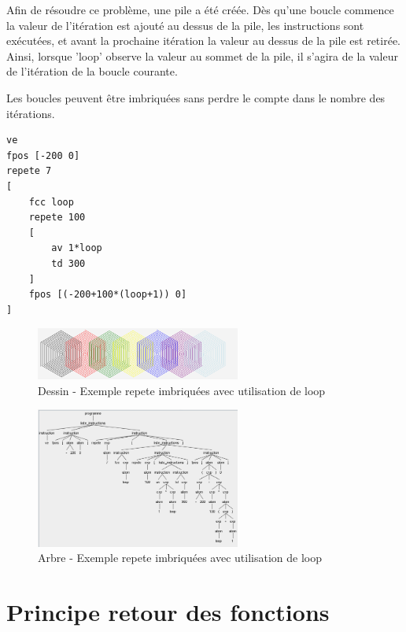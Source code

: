 \documentclass[a4paper,11pt]{article}
\begin{document}
Afin de résoudre ce problème, une pile a été créée. Dès qu'une boucle commence la valeur de l'itération est ajouté au dessus de la pile, les instructions sont exécutées, et avant la prochaine itération la valeur au dessus de la pile est retirée. Ainsi, lorsque 'loop' observe la valeur au sommet de la pile, il s'agira de la valeur de l'itération de la boucle courante.

Les boucles peuvent être imbriquées sans perdre le compte dans le nombre des itérations. 
\begin{lstlisting}[language=LOGO]
ve
fpos [-200 0]
repete 7
[
	fcc loop
	repete 100
	[
		av 1*loop
		td 300
	]
	fpos [(-200+100*(loop+1)) 0]	
]
\end{lstlisting}
\begin{figure}[!h]
	\centering
	\includegraphics[width=0.6\textwidth]{img/loop_figure}
	\caption{Dessin - Exemple repete imbriquées avec utilisation de loop}
\end{figure}
\begin{figure}[!h]
	\centering
	\includegraphics[width=0.6\textwidth]{img/loop_tree}
	\caption{Arbre - Exemple repete imbriquées avec utilisation de loop}
\end{figure}
\section{Principe retour des fonctions}


\end{document}
